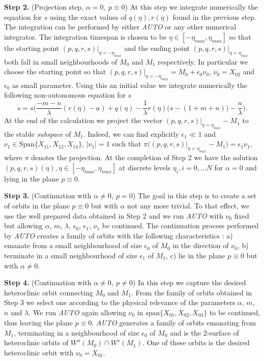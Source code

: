 \documentclass[usletter,11pt]{article}
\theoremstyle{remark}
\begin{document}
{\bf Step 2.} (Projection step, $\alpha=0, \ p\equiv 0$) At this step we integrate numerically the equation for $s$ using the  exact values of $q(\eta), r(\eta)$ found in the previous step. The integration can be performed by either \emph{AUTO} or any other numerical integrator. The integration timespan is chosen to be $\eta\in[-\eta_{max},\eta_{max}]$ so that 
the starting point $(p,q,r,s)|_{\eta=-\eta_{max}}$ and the ending point $(p,q,r,s)|_{\eta=\eta_{max}}$ both fall in small neighbourhoods of $M_0$ and $M_1$ respectively. In particular we choose the starting point so that $(p,q,r,s)|_{\eta=-\eta_{max}}=M_0 + \epsilon_0 \nu_0$, $\nu_0 = X_{02}$ and $\epsilon_0$ as small parameter. Using this an initial value we integrate numerically 
the following non-autonomous equation for $s$
$$
\dot{s} =s\Big(\frac{-m-n}{\lambda}(r(\eta)-a) + q(\eta) - \frac{1}{\lambda}r(\eta)\big(s- (1+m+n)\big) - \frac{n}{\lambda}\Big).
$$
At the end of the calculation we project the vector $(p,q,r,s)|_{\eta=\eta_{max}}- M_1$ to the stable {\it subspace} of $M_1$.  Indeed,  we can find explicitly $\epsilon_1\ll 1$ and $\nu_1 \in \underset{}{ \textrm{Span}}\{X_{11},X_{12},X_{14}\}$, $|\nu_1|=1$ such that
$\pi\big((p,q,r,s)|_{\eta=\eta_{max}}- M_1\big) =\epsilon_1 \nu_1$, where $\pi$ denotes the projection. 
At the completion of Step 2 we have the solution $(p,q,r,s)(\eta), \eta\in[-\eta_{max},\eta_{max}]$ at discrete levels $\eta_i, i=0,\dots N$ for $\alpha=0$ and lying in the plane $p\equiv 0$. 

{\bf Step 3.} (Continuation with $\alpha\neq 0, \ p=0$) The goal in this step is to create a set of orbits in the plane $p\equiv 0$ but with $\alpha$ not any more trivial. To that effect, we use the well prepared data obtained in Step 2 and we run \emph{AUTO} with $\nu_0$ fixed but allowing $\alpha$, $m$, $\lambda$, $\epsilon_0$, $\epsilon_1$, $\nu_1$ be continued. The continuation process performed by \emph{AUTO} creates a family of orbits with the following characteristics : a) emanate from a small neighbourhood of size $\epsilon_0$ of $M_0$ in the direction of  $\nu_0$, b) terminate in a small neighbourhood of size $\epsilon_1$ of $M_1$, c) lie in the plane $p\equiv 0$ but with $\alpha\neq 0$.  




{\bf Step 4.} (Continuation with $\alpha\neq 0, \ p\neq 0$) In this step we capture the desired heteroclinic orbit connecting $M_0$ and $M_1$. From the family of orbits obtained in Step 3 we select one according to the physical relevance of the parameters $\alpha$, $m$, $n$ and $\lambda$. We run \emph{AUTO} again allowing  $\nu_0$ in $\underset{}{ \textrm{span}}\{X_{01},X_{02},X_{03}\}$ to be continued, thus leaving the plane $p\equiv 0$. \emph{AUTO} generates a family of orbits emanating from $M_1$, terminating in a neighbourhood of size $\epsilon_0$ of $M_0$ and is the 2-surface of heteroclinic orbits of $W^u(M_0)\cap W^s(M_1)$. One of these orbits is the desired heteroclinic orbit  with $\nu_0=X_{01}$. 
\end{document}
